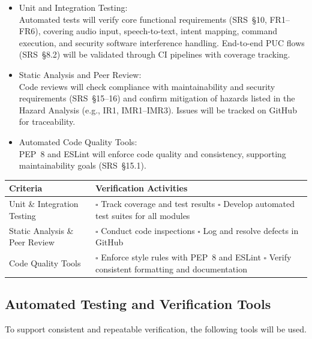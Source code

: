 \documentclass[12pt, titlepage]{article}
\begin{document}
\begin{itemize}
    \item Unit and Integration Testing: \\
    Automated tests will verify core functional requirements (SRS~§10, FR1--FR6), covering audio input, speech-to-text, intent mapping, command execution, and security software interference handling. End-to-end PUC flows (SRS~§8.2) will be validated through CI pipelines with coverage tracking.

    \item Static Analysis and Peer Review: \\
    Code reviews will check compliance with maintainability and security requirements (SRS~§15--16) and confirm mitigation of hazards listed in the Hazard Analysis (e.g., IR1, IMR1--IMR3). Issues will be tracked on GitHub for traceability.

    \item Automated Code Quality Tools: \\
    PEP~8 and ESLint will enforce code quality and consistency, supporting maintainability goals (SRS~§15.1).
\end{itemize}

\begin{table}[H]
\centering
\renewcommand{\arraystretch}{1.3}
\begin{tabular}{|p{6cm}|p{8cm}|}
\hline
Criteria & Verification Activities \\ \hline
Unit \& Integration Testing &
\(\square\) Track coverage and test results \newline
\(\square\) Develop automated test suites for all modules \\ \hline
Static Analysis \& Peer Review &
\(\square\) Conduct code inspections \newline
\(\square\) Log and resolve defects in GitHub \\ \hline
Code Quality Tools &
\(\square\) Enforce style rules with PEP~8 and ESLint \newline
\(\square\) Verify consistent formatting and documentation \\ \hline
\end{tabular}
\end{table}


\subsection{Automated Testing and Verification Tools}

To support consistent and repeatable verification, the following tools will be used.
\end{document}
